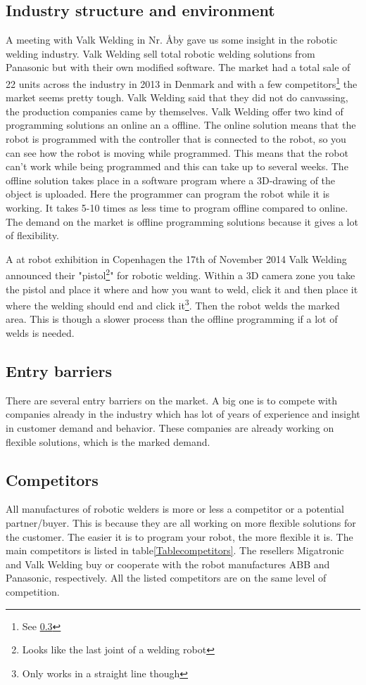 \subsection{Industry structure and environment}
\label{ind.struc}
A meeting with Valk Welding in Nr. Åby gave us some insight in the robotic welding industry. Valk Welding sell total robotic welding solutions from Panasonic but with their own modified software. The market had  a total sale of 22 units across the industry in 2013 in Denmark and with a few competitors\footnote{See \ref{competitors}} the market seems pretty tough. Valk Welding said that they did not do canvassing, the production companies came by themselves. Valk Welding offer two kind of programming solutions an online an a offline. The online solution means that the robot is programmed with the controller that is connected to the robot, so you can see how the robot is moving while programmed. This means that the robot can't work while being programmed and this can take up to several weeks. The offline solution takes place in a software program where a 3D-drawing of the object is uploaded. Here the programmer can program the robot while it is working. It takes 5-10 times as less time to program offline compared to online. The demand on the market is offline programming solutions because it gives a lot of flexibility.

A at robot exhibition in Copenhagen the 17th of November 2014 Valk Welding announced their "pistol\footnote{Looks like the last joint of a welding robot}" for robotic welding. Within a 3D camera zone you take the pistol and place it where and how you want to weld, click it and then place it where the welding should end and click it\footnote{Only works in a straight line though}. Then the robot welds the marked area. This is though a slower process than the offline programming if a lot of welds is needed.
\subsection{Entry barriers}
There are several entry barriers on the market. A big one is to compete with companies already in the industry which has lot of years of experience and insight in customer demand and behavior. These companies are already working on flexible solutions, which is the marked demand. 
\subsection{Competitors}
\label{competitors}
All manufactures of robotic welders is more or less a competitor or a potential partner/buyer. This is because they are all working on more flexible solutions for the customer. The easier it is to program your robot, the more flexible it is. The main competitors is listed in table\ref{Tablecompetitors}. The resellers Migatronic and Valk Welding buy or cooperate with the  robot manufactures ABB and Panasonic, respectively. All the listed competitors are on the same level of competition.

